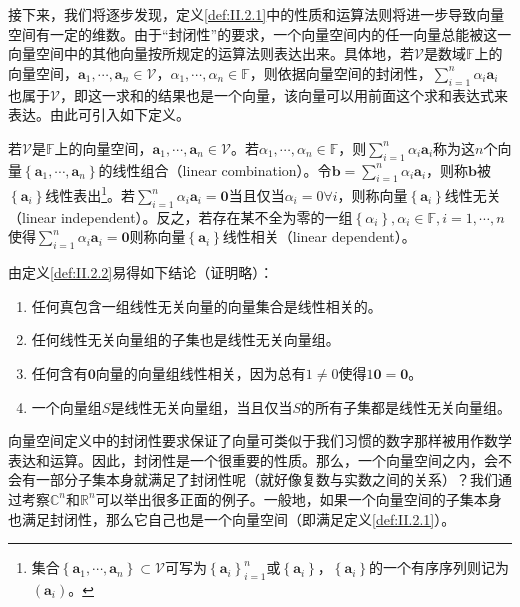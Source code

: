 \documentclass[../main.tex]{subfiles}
\begin{document}
接下来，我们将逐步发现，定义\ref{def:II.2.1}中的性质和运算法则将进一步导致向量空间有一定的维数。由于“封闭性”的要求，一个向量空间内的任一向量总能被这一向量空间中的其他向量按所规定的运算法则表达出来。具体地，若$\mathcal{V}$是数域$\mathbb{F}$上的向量空间，$\mathbf{a}_1,\cdots,\mathbf{a}_n\in\mathcal{V}$，$\alpha_1,\cdots,\alpha_n\in\mathbb{F}$，则依据向量空间的封闭性，$\sum_{i=1}^n\alpha_i\mathbf{a}_i$也属于$\mathcal{V}$，即这一求和的结果也是一个向量，该向量可以用前面这个求和表达式来表达。由此可引入如下定义。

\begin{definition}\label{def:II.2.2}
    若$\mathcal{V}$是$\mathbb{F}$上的向量空间，$\mathbf{a}_1,\cdots,\mathbf{a}_n\in\mathcal{V}$。若$\alpha_1,\cdots,\alpha_n\in\mathbb{F}$，则$\sum_{i=1}^n\alpha_i\mathbf{a}_i$称为这$n$个向量$\left\{\mathbf{a}_1,\cdots,\mathbf{a}_n\right\}$的线性组合（linear combination）。令$\mathbf{b}=\sum_{i=1}^n\alpha_i\mathbf{a}_i$，则称$\mathbf{b}$被$\left\{\mathbf{a}_i\right\}$线性表出\footnote{集合$\left\{\mathbf{a}_1,\cdots,\mathbf{a}_n\right\}\subset\mathcal{V}$可写为$\left\{\mathbf{a}_i\right\}_{i=1}^n$或$\left\{\mathbf{a}_i\right\}$，$\left\{\mathbf{a}_i\right\}$的一个有序序列则记为$\left(\mathbf{a}_i\right)$。}。若$\sum_{i=1}^n\alpha_i\mathbf{a}_i=\bm{0}$当且仅当$\alpha_i=0\forall i$，则称向量$\left\{\mathbf{a}_i\right\}$线性无关（linear independent）。反之，若存在某不全为零的一组$\left\{\alpha_i\right\},\alpha_i\in\mathbb{F},i=1,\cdots,n$使得$\sum_{i=1}^n\alpha_i\mathbf{a}_i=\bm{0}$则称向量$\left\{\mathbf{a}_i\right\}$线性相关（linear dependent）。
\end{definition}

由定义\ref{def:II.2.2}易得如下结论（证明略）：
\begin{enumerate}
    \item 任何真包含一组线性无关向量的向量集合是线性相关的\cite[定理3.1、3.2, p.~98]{周胜林2012线性代数}。
    \item 任何线性无关向量组的子集也是线性无关向量组\cite[\S7.2“(2)”,p.~171]{周胜林2012线性代数}。
    \item 任何含有$\mathbf{0}$向量的向量组线性相关，因为总有$1\neq 0$使得$1\mathbf{0}=\mathbf{0}$。
    \item 一个向量组$S$是线性无关向量组，当且仅当$S$的所有子集都是线性无关向量组。
\end{enumerate}

向量空间定义中的封闭性要求保证了向量可类似于我们习惯的数字那样被用作数学表达和运算。因此，封闭性是一个很重要的性质。那么，一个向量空间之内，会不会有一部分子集本身就满足了封闭性呢（就好像复数与实数之间的关系）？我们通过考察$\mathbb{C}^n$和$\mathbb{R}^n$可以举出很多正面的例子。一般地，如果一个向量空间的子集本身也满足封闭性，那么它自己也是一个向量空间（即满足定义\ref{def:II.2.1}）。
\end{document}

